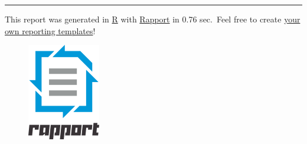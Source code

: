 \documentclass[]{article}
\makeatletter
\def\maxwidth{\ifdim\Gin@nat@width>\linewidth\linewidth
\else\Gin@nat@width\fi}
\let\Oldincludegraphics\includegraphics
\renewcommand{\includegraphics}[1]{\Oldincludegraphics[width=\maxwidth]{#1}}
\makeatother
\begin{document}
\begin{center}\rule{3in}{0.4pt}\end{center}

This report was generated in \href{http://www.r-project.org/}{R} with
\href{http://al3xa.github.com/rapport/}{Rapport} in 0.76 sec.~Feel free
to create \href{http://al3xa.github.com/rapport/#custom}{your own
reporting templates}!

\begin{figure}[htbp]
\centering
\includegraphics{images/rapport.png}
\caption{}
\end{figure}
\end{document}
